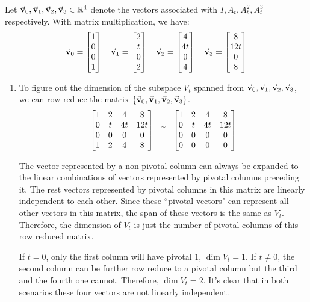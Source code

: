 \documentclass{article}
\begin{document}
\begin{exercise}{11}
\end{exercise}

\begin{exercise}{12}
\def \Vi{\Vect{v}_0}
\def \Va{\Vect{v}_1}
\def \Vb{\Vect{v}_2}
\def \Vc{\Vect{v}_3}

Let $\Vi,\Va,\Vb,\Vc \in \mathbb{R}^4$ denote the vectors associated with $I, A_t, A_t^2, A_t^3$ respectively. With matrix multiplication, we have:
$$\Vi = \cmat{1\\0\\0\\1} \quad \Va = \cmat{2\\t\\0\\2} \quad \Vb = \cmat{4\\4t\\0\\4} \quad \Vc = \cmat{8\\12t\\0\\8}$$

\begin{enumerate}
\item To figure out the dimension of the subspace $V_t$ spanned from $\Vi, \Va, \Vb, \Vc$, we can row reduce the matrix $\{\Vi, \Va, \Vb, \Vc\}$.
$$\begin{bmatrix}1&2&4&8\\0&t&4t&12t\\0&0&0&0\\1&2&4&8\end{bmatrix} \quad\widetilde{}\quad \begin{bmatrix}1&2&4&8\\0&t&4t&12t\\0&0&0&0\\0&0&0&0\end{bmatrix}$$

The vector represented by a non-pivotal column can always be expanded to the linear combinations of vectors represented by pivotal columns preceding it. The rest vectors represented by pivotal columns in this matrix are linearly independent to each other. Since these ``pivotal vectors" can represent all other vectors in this matrix, the span of these vectors is the same as $V_t$. Therefore, the dimension of $V_t$ is just the number of pivotal columns of this row reduced matrix.

If $t = 0$, only the first column will have pivotal $1$, $\dim{V_t} = 1$. If $t \neq 0$, the second column can be further row reduce to a pivotal column but  the third and the fourth one cannot. Therefore, $\dim{V_t} = 2$. It's clear that in both scenarios these four vectors are not linearly independent.


\end{enumerate}
\end{exercise}
\end{document}
